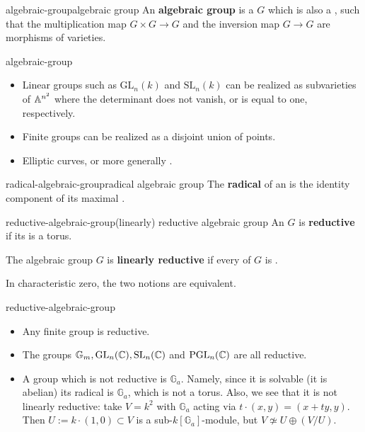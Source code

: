 \begin{topic}{algebraic-group}{algebraic group}
    An \textbf{algebraic group} is a  $G$ which is also a , such that the multiplication map $G \times G \to G$ and the inversion map $G \to G$ are morphisms of varieties.
\end{topic}

\begin{example}{algebraic-group}
    \begin{itemize}
        \item Linear groups such as $\text{GL}_n(k)$ and $\text{SL}_n(k)$ can be realized as subvarieties of $\AA^{n^2}$ where the determinant does not vanish, or is equal to one, respectively.
        \item Finite groups can be realized as a disjoint union of points.
        \item Elliptic curves, or more generally .
    \end{itemize}
\end{example}

\begin{topic}{radical-algebraic-group}{radical algebraic group}
    The \textbf{radical} of an  is the identity component of its maximal   .
\end{topic}

\begin{topic}{reductive-algebraic-group}{(linearly) reductive algebraic group}
    An  $G$ is \textbf{reductive} if its  is a torus.
    
    The algebraic group $G$ is \textbf{linearly reductive} if every  of $G$ is .
    
    In characteristic zero, the two notions are equivalent.
\end{topic}

\begin{example}{reductive-algebraic-group}
    \begin{itemize}
        \item Any finite group is reductive.
        \item The groups $\mathbb{G}_m, \text{GL}_n(\CC), \text{SL}_n(\CC)$ and $\text{PGL}_n(\CC)$ are all reductive. 
        \item A group which is not reductive is $\mathbb{G}_a$. Namely, since it is solvable (it is abelian) its radical is $\mathbb{G}_a$, which is not a torus. Also, we see that it is not linearly reductive: take $V = k^2$ with $\mathbb{G}_a$ acting via $t \cdot (x, y) = (x + ty, y)$. Then $U := k \cdot (1, 0) \subset V$ is a sub-$k[\mathbb{G}_a]$-module, but $V \not\simeq U \oplus (V / U)$.
    \end{itemize}
\end{example}

